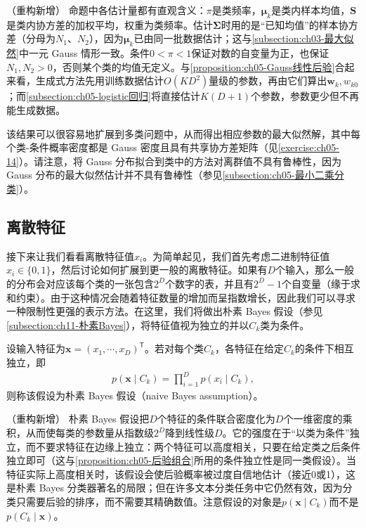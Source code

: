 \documentclass[../../main.tex]{subfiles}
\begin{document}
\begin{remark}（重构新增）
命题中各估计量都有直观含义：$\pi$是类频率，$\boldsymbol{\mu}_k$是类内样本均值，$\boldsymbol{S}$是类内协方差的加权平均，权重为类频率。估计$\boldsymbol{\Sigma}$时用的是“已知均值”的样本协方差（分母为$N_1$、$N_2$），因为$\boldsymbol{\mu}_k$已由同一批数据估计；这与\cref{subsection:ch03-最大似然}中一元 Gauss 情形一致。条件$0<\pi<1$保证对数的自变量为正，也保证$N_1,N_2>0$，否则某个类的均值无定义。与\cref{proposition:ch05-Gauss线性后验}合起来看，生成式方法先用训练数据估计$O(KD^{2})$量级的参数，再由它们算出$\boldsymbol{w}_k,w_{k0}$；而\cref{subsection:ch05-logistic回归}将直接估计$K(D+1)$个参数，参数更少但不再能生成数据。
\end{remark}

该结果可以很容易地扩展到多类问题中，从而得出相应参数的最大似然解，其中每个类-条件概率密度都是 Gauss 密度且具有共享协方差矩阵（见\cref{exercise:ch05-14}）。请注意，将 Gauss 分布拟合到类中的方法对离群值不具有鲁棒性，因为 Gauss 分布的最大似然估计并不具有鲁棒性（参见\cref{subsection:ch05-最小二乘分类}）。

\subsection{离散特征}\label{subsection:ch05-离散特征}

接下来让我们看看离散特征值$x_i$。为简单起见，我们首先考虑二进制特征值$x_i\in\{0,1\}$，然后讨论如何扩展到更一般的离散特征。如果有$D$个输入，那么一般的分布会对应该每个类的一张包含$2^{D}$个数字的表，并且有$2^{D}-1$个自变量（缘于求和约束）。由于这种情况会随着特征数量的增加而呈指数增长，因此我们可以寻求一种限制性更强的表示方法。在这里，我们将做出朴素 Bayes 假设（参见\cref{subsection:ch11-朴素Bayes}），将特征值视为独立的并以$C_k$类为条件。

\begin{definition}[朴素 Bayes 假设]\label{definition:ch05-朴素Bayes假设}
设输入特征为$\boldsymbol{x}=(x_1,\cdots,x_D)^{\mathsf{T}}$。若对每个类$C_k$，各特征在给定$C_k$的条件下相互独立，即
\begin{align}
  p(\boldsymbol{x}\mid C_k)=\prod_{i=1}^{D}p(x_i\mid C_k),
\end{align}
则称该假设为朴素 Bayes 假设（naive Bayes assumption）。
\end{definition}

\begin{remark}（重构新增）
朴素 Bayes 假设把$D$个特征的条件联合密度化为$D$个一维密度的乘积，从而使每类的参数量从指数级$2^{D}$降到线性级$D$。它的强度在于“以类为条件”独立，而不要求特征在边缘上独立：两个特征可以高度相关，只要在给定类之后条件独立即可（这与\cref{proposition:ch05-后验组合}所用的条件独立性是同一类假设）。当特征实际上高度相关时，该假设会使后验概率被过度自信地估计（接近0或1），这是朴素 Bayes 分类器著名的局限；但在许多文本分类任务中它仍然有效，因为分类只需要后验的排序，而不需要其精确数值。注意假设的对象是$p(\boldsymbol{x}\mid C_k)$而不是$p(C_k\mid\boldsymbol{x})$。
\end{remark}
\end{document}

